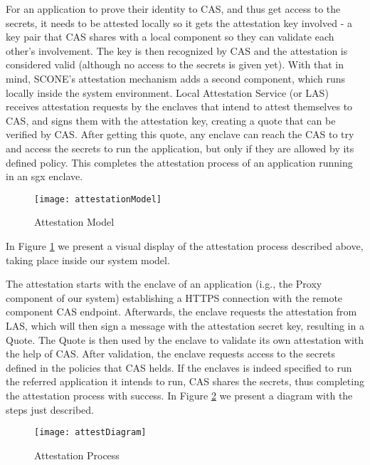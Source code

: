 For an application to prove their identity to CAS, and thus get access to the secrets, it needs to be attested locally so it gets the attestation key involved - a key pair that CAS shares with a local component so they can validate each other's involvement. The key is then recognized by CAS and the attestation is considered valid (although no access to the secrets is given yet). With that in mind, SCONE's attestation mechanism adds a second component, which runs locally inside the system environment. Local Attestation Service (or LAS) receives attestation requests by the enclaves that intend to attest themselves to CAS, and signs them with the attestation key, creating a quote that can be verified by CAS. After getting this quote, any enclave can reach the CAS to try and access the secrets to run the application, but only if they are allowed by its defined policy. This completes the attestation process of an application running in an \gls{sgx} enclave. 

\begin{figure}[htbp]
	\centering
	{\texttt{[image: attestationModel]}}
	\caption{Attestation Model}
	\label{fig:attestationModel}
\end{figure}

In Figure \ref{fig:attestationModel} we present a visual display of the attestation process described above, taking place inside our system model.

The attestation starts with the enclave of an application (i.g., the Proxy component of our system) establishing a HTTPS connection with the remote component CAS endpoint. Afterwards, the enclave requests the attestation from LAS, which will then sign a message with the attestation secret key, resulting in a Quote. The Quote is then used by the enclave to validate its own attestation with the help of CAS. After validation, the enclave requests access to the secrets defined in the policies that CAS helds. If the enclaves is indeed specified to run the referred application it intends to run, CAS shares the secrets, thus completing the attestation process with success. In Figure \ref{fig:attestationProcess} we present a diagram with the steps just described.

\begin{figure}[htbp]
	\centering
	{\texttt{[image: attestDiagram]}}
	\caption{Attestation Process}
	\label{fig:attestationProcess}
\end{figure}


\vspace{5mm} 

